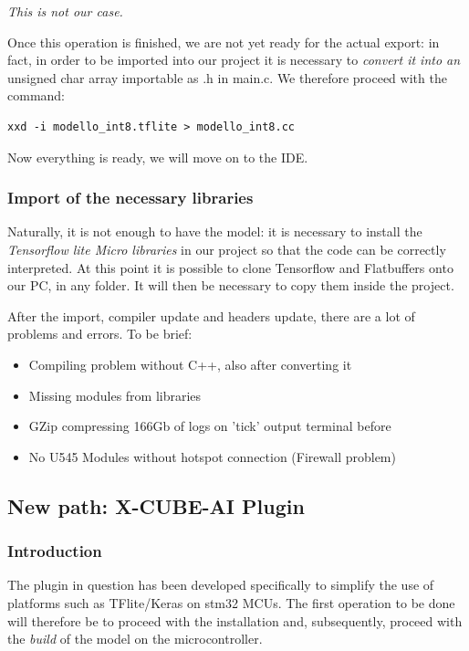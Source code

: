 \begin{center}
    \textit{This is not our case.}
\end{center}

Once this operation is finished, we are not yet ready for the actual export: in fact, in order to be imported into our project it is necessary to \textit{convert it into an} unsigned char array importable as .h in main.c. We therefore proceed with the command:
\begin{verbatim}
xxd -i modello_int8.tflite > modello_int8.cc
\end{verbatim}
Now everything is ready, we will move on to the IDE.

\subsubsection{Import of the necessary libraries}
Naturally, it is not enough to have the model: it is necessary to install the \textit{Tensorflow lite Micro libraries} in our project so that the code can be correctly interpreted. At this point it is possible to clone Tensorflow and Flatbuffers onto our PC, in any folder. It will then be necessary to copy them inside the project.

After the import, compiler update and headers update, there are a lot of problems and errors. To be brief:
\begin{itemize}
    \item Compiling problem without C++, also after converting it
    \item Missing modules from libraries
    \item GZip compressing 166Gb of logs on 'tick' output terminal before
    \item No U545 Modules without hotspot connection (Firewall problem)
\end{itemize}


\subsection{New path: X-CUBE-AI Plugin}
\subsubsection{Introduction}

The plugin in question has been developed specifically to simplify the use of platforms such as TFlite/Keras on stm32 MCUs. The first operation to be done will therefore be to proceed with the installation and, subsequently, proceed with the \textit{build} of the model on the microcontroller.


